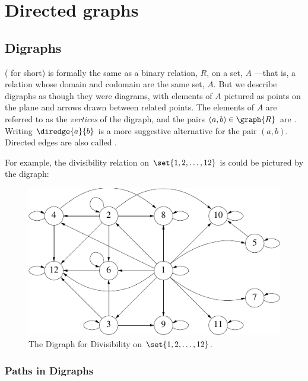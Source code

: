 \chapter{Directed graphs}\label{digraphs_chap}

\section{Digraphs}\label{digraphs_sec}

 (
for short) is formally the same as a binary relation, $R$, on a set,
$A$ ---that is, a relation whose domain and codomain are the same set,
$A$.  But we describe digraphs as though they were diagrams, with
elements of $A$ pictured as points on the plane and arrows drawn
between related points.  The elements of $A$ are referred to as the
\emph{vertices} of the digraph, and the pairs $(a,b) \in \graph{R}$
are .  Writing $\diredge{a}{b}$ is a more
suggestive alternative for the pair $(a,b)$.  Directed edges are also
called .

For example, the divisibility relation on $\set{1,2,\dots,12}$ is
could be pictured by the digraph:
\begin{figure}[h]
\centering \includegraphics{figures/divisibility.pdf}
\caption{The Digraph for Divisibility on $\set{1,2,\dots,12}$.}
\label{fig:divisibility-digraph}
\end{figure}


\subsection{Paths in Digraphs}


